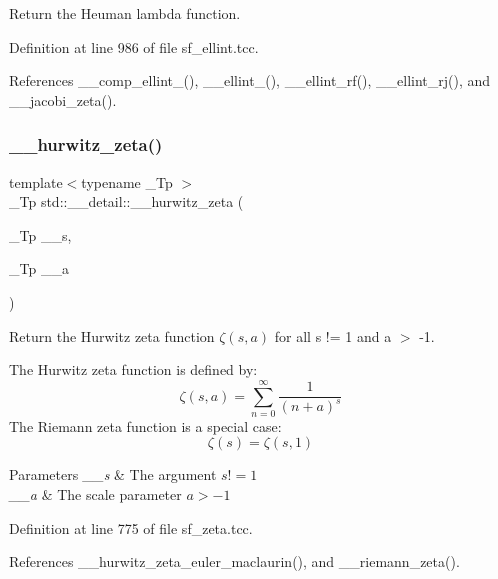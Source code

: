 Return the Heuman lambda function. 

Definition at line 986 of file sf\+\_\+ellint.\+tcc.



References \+\_\+\+\_\+comp\+\_\+ellint\+\_(), \+\_\+\+\_\+ellint\+\_(), \+\_\+\+\_\+ellint\+\_\+rf(), \+\_\+\+\_\+ellint\+\_\+rj(), and \+\_\+\+\_\+jacobi\+\_\+zeta().

\mbox{\label{namespacestd_1_1____detail_a63aafed798ada71b2cc58e84a6652169}} 
\subsubsection{\texorpdfstring{\+\_\+\+\_\+hurwitz\+\_\+zeta()}{\_\_hurwitz\_zeta()}}
{\footnotesize\ttfamily template$<$typename \+\_\+\+Tp $>$ \\
\+\_\+\+Tp std\+::\+\_\+\+\_\+detail\+::\+\_\+\+\_\+hurwitz\+\_\+zeta (\begin{DoxyParamCaption}\item[{\+\_\+\+Tp}]{\+\_\+\+\_\+s,  }\item[{\+\_\+\+Tp}]{\+\_\+\+\_\+a }\end{DoxyParamCaption})}



Return the Hurwitz zeta function $ \zeta(s,a) $ for all s != 1 and a $>$ -\/1. 

The Hurwitz zeta function is defined by\+: \[ \zeta(s,a) = \sum_{n=0}^{\infty} \frac{1}{(n+a)^s} \] The Riemann zeta function is a special case\+: \[ \zeta(s) = \zeta(s,1) \]


\begin{DoxyParams}{Parameters}
{\em \+\_\+\+\_\+s} & The argument $ s != 1 $ \\
\hline
{\em \+\_\+\+\_\+a} & The scale parameter $ a > -1 $ \\
\hline
\end{DoxyParams}


Definition at line 775 of file sf\+\_\+zeta.\+tcc.



References \+\_\+\+\_\+hurwitz\+\_\+zeta\+\_\+euler\+\_\+maclaurin(), and \+\_\+\+\_\+riemann\+\_\+zeta().



